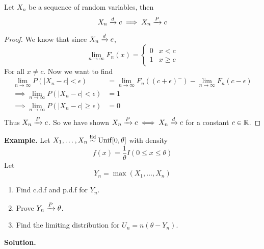     \begin{theorem}
        Let $X_n$ be a sequence of random variables, then 
        \[X_n \xrightarrow{d} c \implies X_n \xrightarrow{P} c\]
    \end{theorem}
    \begin{proof}
        We know that since $X_n \xrightarrow{d} c$, 
        \[\lim_{n\rightarrow \infty}F_n(x) = \begin{cases}
            0 & x  < c\\
            1 & x \geq c
        \end{cases}\]
        For all $x \neq c$. Now we want to find 
        \begin{align*}
            \lim_{n\rightarrow\infty}P(|X_n-c| < \epsilon) &= \lim_{n\rightarrow\infty}F_n((c+\epsilon)^-) - \lim_{n\rightarrow \infty}F_n(c-\epsilon)\\
            \implies \lim_{n\rightarrow \infty}P(|X_n-c| < \epsilon) &= 1\\
            \implies \lim_{n\rightarrow \infty}P(|X_n-c| \geq \epsilon) &= 0\\
        \end{align*}
        Thus $X_n \xrightarrow{P} c$. So we have shown $X_n \xrightarrow{P} c \iff X_n \xrightarrow{d} c$ for a constant $c \in \mathbb{R}$.
    \end{proof}
    \textbf{Example.} Let $X_1, \ldots, X_n \overset{\mathrm{iid}}{\sim} \operatorname{Unif}[0, \theta]$ with density 
    \[f(x) = \frac{1}{\theta}I(0 \leq x \leq \theta)\]
    Let 
    \[Y_n = \max(X_1, \ldots, X_n)\]
    \begin{enumerate}[label=(\roman*)]
        \item Find c.d.f and p.d.f for $Y_n$.
        \item Prove $Y_n \xrightarrow{P} \theta$.
        \item Find the limiting distribution for $U_n = n(\theta - Y_n)$.
    \end{enumerate}
    \textbf{Solution.}

